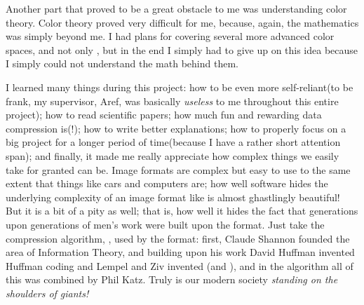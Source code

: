 Another part that proved to be a great obstacle to me was
understanding color theory. Color theory proved very difficult for me,
because, again, the mathematics was simply beyond me. I had plans for
covering several more advanced color spaces, and not only \rgb, but in
the end I simply had to give up on this idea because I simply could
not understand the math behind them.

I learned many things during this project: how to be even more
self-reliant(to be frank, my supervisor, Aref, was basically
\textit{useless} to me throughout this entire project); how to read
scientific papers; how much fun and rewarding data compression is(!);
how to write better explanations; how to properly focus on a big
project for a longer period of time(because I have a rather short
attention span); and finally, it made me really appreciate how complex
things we easily take for granted can be. Image formats are complex
but easy to use to the same extent that things like cars and computers
are; how well software hides the underlying complexity of an image
format like \png is almost ghastlingly beautiful! But it is a bit of a
pity as well; that is, how well it hides the fact that generations
upon generations of men's work were built upon the format. Just take
the compression algorithm, , used by the format: first, Claude
Shannon founded the area of Information Theory, and building upon his
work David Huffman invented Huffman coding and Lempel and Ziv invented
\lzone(and \lztwo), and in the  algorithm all of this was
combined by Phil Katz. Truly is our modern society \textit{standing on
  the shoulders of giants!}

